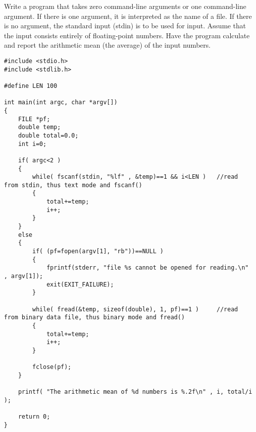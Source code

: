 \begin{question}
  Write a program that takes zero command-line arguments or one command-line
  argument. If there is one argument, it is interpreted as the name of a file. If there is no
  argument, the standard input (stdin) is to be used for input. Assume that the input
  consists entirely of floating-point numbers. Have the program calculate and report the
  arithmetic mean (the average) of the input numbers.
\end{question}
\begin{solution}
  \begin{verbatim}
#include <stdio.h>
#include <stdlib.h>

#define LEN 100

int main(int argc, char *argv[])
{
	FILE *pf;
	double temp;
	double total=0.0;
	int i=0;

	if( argc<2 )
	{
		while( fscanf(stdin, "%lf" , &temp)==1 && i<LEN )	//read from stdin, thus text mode and fscanf()
		{
			total+=temp;
			i++;
		}
	}
	else
	{
		if( (pf=fopen(argv[1], "rb"))==NULL )
		{
			fprintf(stderr, "file %s cannot be opened for reading.\n" , argv[1]);
			exit(EXIT_FAILURE);
		}

		while( fread(&temp, sizeof(double), 1, pf)==1 )		//read from binary data file, thus binary mode and fread()
		{
			total+=temp;
			i++;
		}

		fclose(pf);
	}

	printf( "The arithmetic mean of %d numbers is %.2f\n" , i, total/i );

	return 0;
}
  \end{verbatim}
\end{solution}

